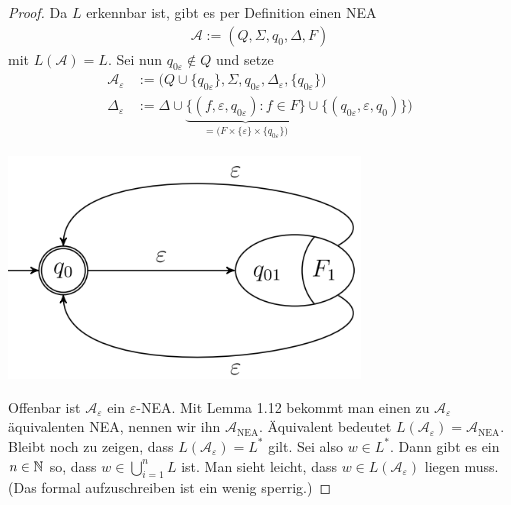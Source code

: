 \documentclass[12pt,a4paper]{article}
\newcommand{\A}{\mathcal{A}}
\begin{document}
\begin{proof}
	Da $L$ erkennbar ist, gibt es per Definition einen NEA
	\begin{align*}
		\A:=(Q,\Sigma,q_0,\Delta,F)
	\end{align*}
	mit $L(\A)=L$. 
	Sei nun $q_{0\varepsilon}\not\in Q$ und setze
	\begin{align*}
		\A_\varepsilon&:=\Big(Q\cup\lbrace q_{0\varepsilon}\rbrace,\Sigma,q_{0\varepsilon},\Delta_\varepsilon,\lbrace q_{0\varepsilon}\rbrace\Big)\\
		\Delta_\varepsilon&:=\Delta\cup\underbrace{\big\lbrace(f,\varepsilon,q_{0\varepsilon}):f\in F\big\rbrace}_{
			=\big(F\times\lbrace\varepsilon\rbrace\times\lbrace q_{0\varepsilon}\rbrace\big)
		}\cup\big\lbrace(q_{0\varepsilon},\varepsilon,q_{0})\big\rbrace\Big)
	\end{align*}
	
	
  \includegraphics[width=0.7\textwidth]{Blatt10_4.png}
  
  Offenbar ist $\A_\varepsilon$ ein $\varepsilon$-NEA. Mit Lemma 1.12 bekommt man einen zu $\A_\varepsilon$ äquivalenten NEA, nennen wir ihn $\A_{\text{NEA}}$. Äquivalent bedeutet $L(\A_\varepsilon)=\A_{\text{NEA}}$.\nl
  Bleibt noch zu zeigen, dass $L(\A_\varepsilon)=L^\ast$ gilt. 
  Sei also $w\in L^\ast$.
  Dann gibt es ein $n\in\mathbb{N}$ so, dass $w\in\bigcup\limits_{i=1}^n L$ ist. Man sieht leicht, dass $w\in L(\A_\varepsilon)$ liegen muss. (Das formal aufzuschreiben ist ein wenig sperrig.)
\end{proof}
\end{document}
